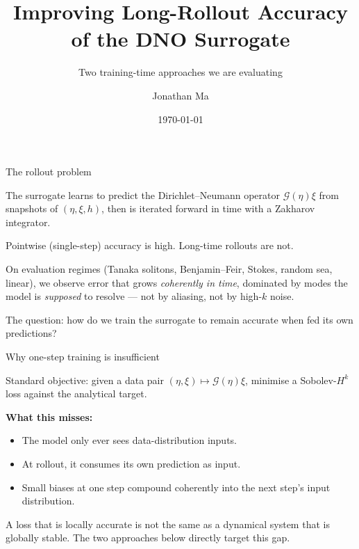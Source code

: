 \documentclass[aspectratio=169,11pt]{beamer}
\title{Improving Long-Rollout Accuracy of the DNO Surrogate}
\subtitle{Two training-time approaches we are evaluating}
\date{\today}
\author{Jonathan Ma}
\newcommand{\Gop}{\mathcal{G}}
\begin{document}
\begin{frame}\titlepage\end{frame}

\begin{frame}{The rollout problem}

The surrogate learns to predict the Dirichlet--Neumann operator
$\Gop(\eta)\xi$ from snapshots of $(\eta,\xi,h)$, then is iterated
forward in time with a Zakharov integrator.

\medskip

Pointwise (single-step) accuracy is high. \alert{Long-time rollouts
are not.}

\pause
\medskip

On evaluation regimes (Tanaka solitons, Benjamin--Feir, Stokes,
random sea, linear), we observe error that grows
\emph{coherently in time}, dominated by modes the model is
\emph{supposed} to resolve --- not by aliasing, not by high-$k$
noise.

\medskip

The question: how do we train the surrogate to remain accurate when
fed its own predictions?
\end{frame}

\begin{frame}{Why one-step training is insufficient}

Standard objective: given a data pair $(\eta,\xi) \mapsto \Gop(\eta)\xi$,
minimise a Sobolev-$H^k$ loss against the analytical target.

\medskip

\textbf{What this misses:}
\begin{itemize}
  \item The model only ever sees \alert{data-distribution} inputs.
  \item At rollout, it consumes its own prediction as input.
  \item Small biases at one step \alert{compound coherently} into the
        next step's input distribution.
\end{itemize}

\pause
\medskip

A loss that is locally accurate is not the same as a dynamical
system that is globally stable. The two approaches below directly
target this gap.
\end{frame}
\end{document}
